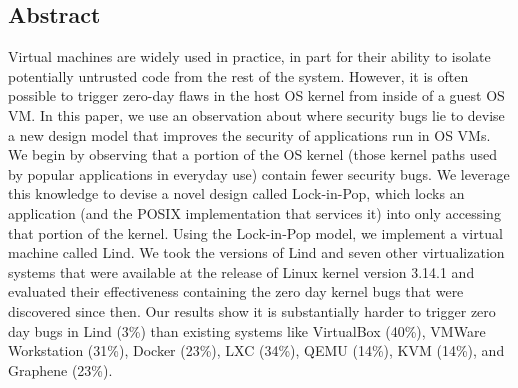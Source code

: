 \subsection*{Abstract}
Virtual machines are widely used in practice, in part for their ability to
isolate potentially untrusted code from the rest of the system.
However, it is often possible to trigger zero-day flaws
in the host OS kernel from inside of a guest OS VM.  %
In this paper, we use an observation about where security bugs lie to
devise a new design model that improves the security of applications
run in OS VMs.  %
We begin by observing that a portion of the OS kernel (those kernel paths used 
by popular applications in everyday use) contain fewer security bugs. We 
leverage this knowledge to devise a novel design called Lock-in-Pop, which 
locks an application (and the POSIX implementation that services it) into only 
accessing that portion of the kernel.  Using the Lock-in-Pop model, we 
implement a virtual machine called Lind.
We took the versions of Lind and seven other virtualization systems that were
available at the release of Linux kernel version 3.14.1 and evaluated
their effectiveness containing the zero day kernel bugs that were discovered 
since then.
Our results show it is substantially harder to trigger zero day bugs in 
Lind (3\%) than existing systems like VirtualBox (40\%), VMWare Workstation
(31\%), Docker (23\%), LXC (34\%), QEMU (14\%), KVM (14\%), and Graphene (23\%).
